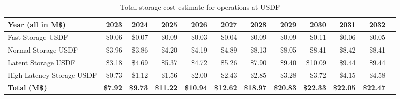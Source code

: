 \tiny \begin{longtable} { |p{}  |r  |r  |r  |r  |r  |r  |r  |r  |r  |r  |r |} 
\caption{Total storage cost estimate for operations at USDF \label{tab:opsStorageUSDF}}\\ 
\hline 
\textbf{Year (all in M\$)}&\textbf{2023}&\textbf{2024}&\textbf{2025}&\textbf{2026}&\textbf{2027}&\textbf{2028}&\textbf{2029}&\textbf{2030}&\textbf{2031}&\textbf{2032} \\ \hline
{Fast Storage USDF}&{\$0.06}&{\$0.07}&{\$0.09}&{\$0.03}&{\$0.04}&{\$0.09}&{\$0.09}&{\$0.11}&{\$0.06}&{\$0.05} \\ \hline
{Normal Storage USDF}&{\$3.96}&{\$3.86}&{\$4.20}&{\$4.19}&{\$4.89}&{\$8.13}&{\$8.05}&{\$8.41}&{\$8.42}&{\$8.41} \\ \hline
{Latent Storage USDF}&{\$3.18}&{\$4.69}&{\$5.37}&{\$4.72}&{\$5.26}&{\$7.90}&{\$9.40}&{\$10.09}&{\$9.44}&{\$9.44} \\ \hline
{High Latency Storage USDF}&{\$0.73}&{\$1.12}&{\$1.56}&{\$2.00}&{\$2.43}&{\$2.85}&{\$3.28}&{\$3.72}&{\$4.15}&{\$4.58} \\ \hline
\textbf{Total (M\$)}&\textbf{\$7.92}&\textbf{\$9.73}&\textbf{\$11.22}&\textbf{\$10.94}&\textbf{\$12.62}&\textbf{\$18.97}&\textbf{\$20.83}&\textbf{\$22.33}&\textbf{\$22.05}&\textbf{\$22.47} \\ \hline
\end{longtable} \normalsize
